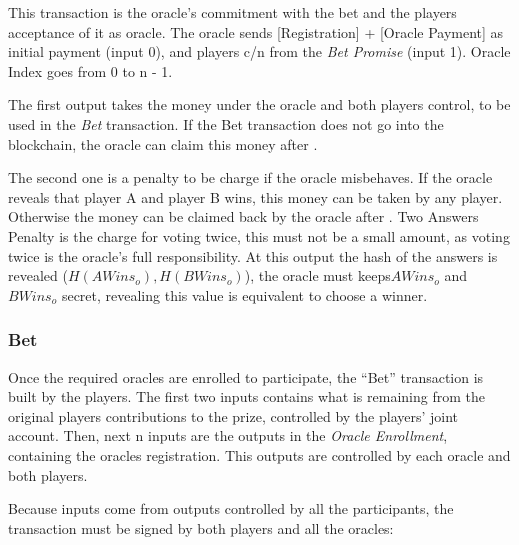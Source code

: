 This transaction is the oracle's commitment with the bet and the players
  acceptance of it as oracle.
The oracle sends [Registration] + [Oracle Payment] as initial payment
  (input 0), and players c/n from the \textit{Bet Promise} (input 1).
Oracle Index goes from 0 to n - 1.

The first output takes the money under the oracle and both players control, to
  be used in the \textit{Bet} transaction.
If the Bet transaction does not go into the blockchain, the oracle can claim
  this money after .

The second one is a penalty to be charge if the oracle misbehaves.
If the oracle reveals that player A and player B wins, this money can be taken
  by any player. Otherwise the money can be claimed back by the oracle after
  .
Two Answers Penalty is the charge for voting twice, this must not be a small
  amount, as voting twice is the oracle's full responsibility.
At this output the hash of the answers is revealed ($H(AWins_o), H(BWins_o)$),
  the oracle must keeps$AWins_o$ and $BWins_o$ secret, revealing this value is
  equivalent to choose a winner.

\subsubsection{Bet}

Once the required oracles are enrolled to participate, the ``Bet'' transaction
  is built by the players.
 The first two inputs contains what is remaining from the original players
   contributions to the prize, controlled by the players' joint account.
Then, next n inputs are the outputs in the \textit{Oracle Enrollment},
  containing the oracles registration.
This outputs are controlled by each oracle and both players.

Because inputs come from outputs controlled by all the participants, the
  transaction must be signed by both players and all the oracles:

